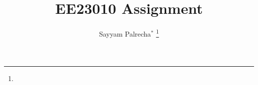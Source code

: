\documentclass[journal,12pt,twocolumn]{IEEEtran}
\theoremstyle{remark}
\begin{document}



\vspace{3cm}

\title{
EE23010 Assignment
}
\author{ Sayyam Palrecha$^{*}$%
	\thanks{}
	
}


%
%
%

% 
%



% 
\end{document}

